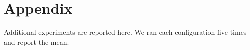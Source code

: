 \section*{Appendix}
Additional experiments are reported here. We ran each configuration five times and report the mean.
